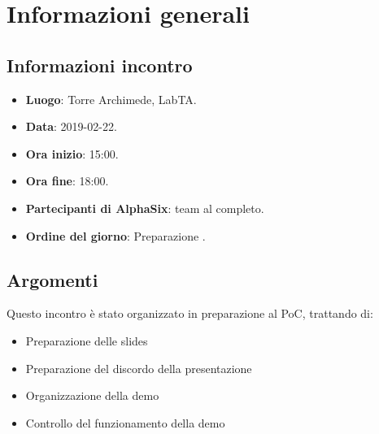 \newcommand{\documento}{\VI}
\newcommand{\nomedocumentofisico}{VI\_2019-02-22.pdf}
\newcommand{\redazione}{\MM}
\newcommand{\verifica}{\CV}
\newcommand{\approvazione}{\SG}
\newcommand{\versione}{1.0.0}
\newcommand{\uso}{Interno}
\newcommand{\destinateTo}{\gruppo}
\newcommand{\datacreazione}{23 febbraio 2019}
\newcommand{\datamodifica}{25 febbraio 2019}
\newcommand{\stato}{Approvato}

\def\TABELLE{false}	%
\def\FIGURE{false} 	%






    

    	
    
    \section{Informazioni generali}
		\subsection{Informazioni incontro}
			\begin{itemize}
				\item \textbf{Luogo}: Torre Archimede, LabTA.
				\item \textbf{Data}: 2019-02-22.
				\item \textbf{Ora inizio}: 15:00.
				\item \textbf{Ora fine}: 18:00.
				\item \textbf{Partecipanti di AlphaSix}: team al completo.
				\item \textbf{Ordine del giorno}: Preparazione .
			\end{itemize}

        \subsection{Argomenti}
            Questo incontro è stato organizzato in preparazione al PoC, trattando di:
            \begin{itemize}
                \item Preparazione delle slides
                \item Preparazione del discordo della presentazione
                \item Organizzazione della demo
                \item Controllo del funzionamento della demo
            \end{itemize}

